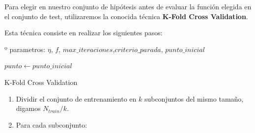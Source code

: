 \documentclass[a4paper, 20pt]{article}
\begin{document}
Para elegir en nuestro conjunto de hipótesis antes de evaluar la función elegida en el conjunto de test, utilizaremos la conocida técnica \textbf{K-Fold Cross Validation}.

Esta técnica consiste en realizar los siguientes pasos:
\begin{algorithm}[H]
  \SetAlgoLined
  º
  parametros: $\eta$, $f$, $max\_iteraciones$,$criterio\_parada$, $punto\_inicial$ \;

  $punto  \leftarrow punto\_inicial$ \;
  \caption{K-Fold Cross Validation}
\end{algorithm}
\begin{enumerate}
\item Dividir el conjunto de entrenamiento en $k$ subconjuntos del mismo tamaño, digamos $N_{train}/k$.
\item Para cada subconjunto:
  \
\end{enumerate}


\newpage
\printbibliography
\end{document}
